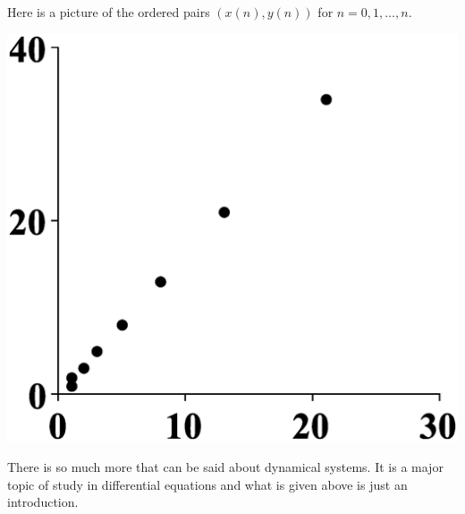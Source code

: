 Here is a picture of
the ordered pairs $(x(n) ,y(n)) $ for $
n=0,1,\ldots,n$.

\begin{center}
\includegraphics[bb=0 0 800 800,scale=.2]{figures/fibonacci.eps}
\end{center}

There is so much more that can be said about dynamical systems. It is a
major topic of study in differential equations and what is given above is
just an introduction.
